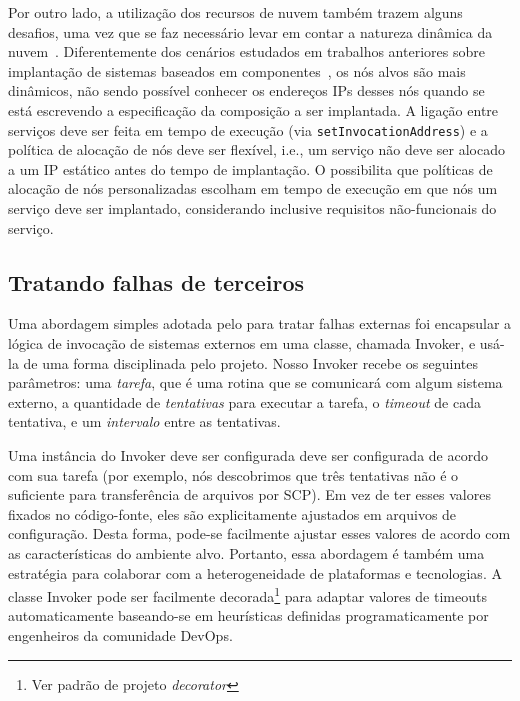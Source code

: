 Por outro lado, a utilização dos recursos de nuvem também trazem alguns desafios,
uma vez que se faz necessário levar em contar a natureza dinâmica da nuvem~\cite{Amazon2012Practices}.
Diferentemente dos cenários estudados em trabalhos anteriores sobre
implantação de sistemas baseados em componentes~\cite{Balter1998Olan,Magee1996Dynamic},
os nós alvos são mais dinâmicos, não sendo possível conhecer os endereços IPs
desses nós quando se está escrevendo a especificação da composição a ser implantada.
A ligação entre serviços deve ser feita em tempo de execução (via \texttt{setInvocationAddress})
e a política de alocação de nós deve ser flexível, i.e.,
um serviço não deve ser alocado a um IP estático antes do tempo de implantação.
O \ee possibilita que políticas de alocação de nós personalizadas
escolham em tempo de execução em que nós um serviço deve ser implantado,
considerando inclusive requisitos não-funcionais do serviço.

\subsection{Tratando falhas de terceiros}
\label{sec:failures}

Uma abordagem simples adotada pelo \ee para tratar falhas externas
foi encapsular a lógica de invocação de sistemas externos em uma classe, 
chamada \textsf{Invoker}, e usá-la de uma forma disciplinada pelo projeto.
Nosso \textsf{Invoker} recebe os seguintes parâmetros:
uma \emph{tarefa}, que é uma rotina que se comunicará com algum sistema externo,
a quantidade de \emph{tentativas} para executar a tarefa,
o \emph{timeout} de cada tentativa, e um \emph{intervalo} entre as tentativas.


Uma instância do \textsf{Invoker} deve ser configurada deve ser configurada
de acordo com sua tarefa (por exemplo, nós descobrimos que três tentativas
não é o suficiente para transferência de arquivos por SCP).
Em vez de ter esses valores fixados no código-fonte, eles são explicitamente
ajustados em arquivos de configuração.
Desta forma, pode-se facilmente ajustar esses valores de acordo com 
as características do ambiente alvo.
Portanto, essa abordagem é também uma estratégia para colaborar 
com a heterogeneidade de plataformas e tecnologias.
A classe \textsf{Invoker} pode ser facilmente decorada\footnote{Ver padrão de projeto \emph{decorator}} para adaptar valores de timeouts automaticamente
baseando-se em heurísticas definidas programaticamente por engenheiros 
da comunidade DevOps.

